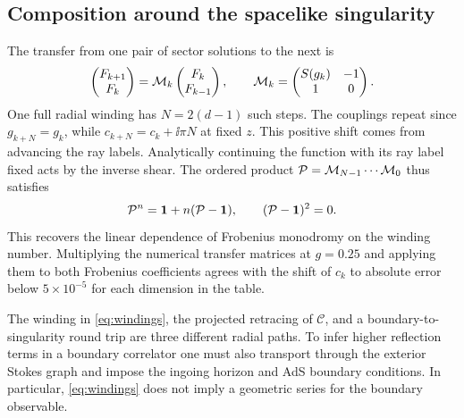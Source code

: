 \subsection{Composition around the spacelike singularity}

The transfer from one pair of sector solutions to the next is
\begin{equation}
 \begin{pmatrix}F_{k+1}\\ F_k\end{pmatrix}
 ={\cal M}_k\begin{pmatrix}F_k\\ F_{k-1}\end{pmatrix},
 \qquad {\cal M}_k=\begin{pmatrix}S(g_k)&-1\\1&0\end{pmatrix}.
\end{equation}
One full radial winding has \(N=2(d-1)\) such steps. The couplings repeat since \(g_{k+N}=g_k\), while \(c_{k+N}=c_k+\ii\pi N\) at fixed \(z\). This positive shift comes from advancing the ray labels. Analytically continuing the function with its ray label fixed acts by the inverse shear. The ordered product \({\cal P}={\cal M}_{N-1}\cdots{\cal M}_0\) thus satisfies
\begin{equation}
 {\cal P}^{n}=\mathbf{1}+n({\cal P}-\mathbf{1}),\qquad
 ({\cal P}-\mathbf{1})^2=0 .
 \label{eq:windings}
\end{equation}
This recovers the linear dependence of Frobenius monodromy on the winding number. Multiplying the numerical transfer matrices at \(g=0.25\) and applying them to both Frobenius coefficients agrees with the shift of \(c_k\) to absolute error below \(5\times10^{-5}\) for each dimension in the table.

The winding in \eqref{eq:windings}, the projected retracing of \(\mathcal C\), and a boundary-to-singularity round trip are three different radial paths. To infer higher reflection terms in a boundary correlator one must also transport through the exterior Stokes graph and impose the ingoing horizon and AdS boundary conditions. In particular, \eqref{eq:windings} does not imply a geometric series for the boundary observable.
